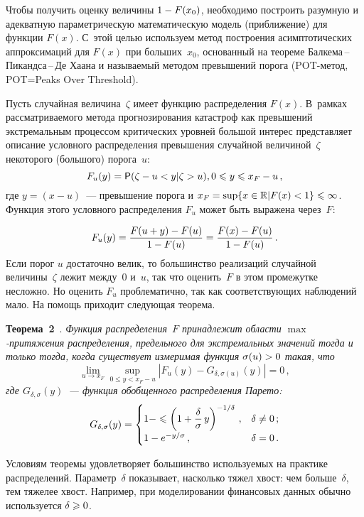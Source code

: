 \begin{multicols}{2}
Чтобы получить оценку величины $1\hm-F(x_0)$, необходимо построить
разумную и адекватную парамет\-рическую математическую модель
(приближение) для функции $F(x)$. С~этой целью используем метод
построения асимптотических аппрокси\-маций для $F(x)$ при больших~$x_0$, 
основанный на теореме Бал\-ке\-ма\,--\,Пи\-канд\-са\,--\,Де Ха\-ана и
называемый методом превышений порога (POT-ме\-тод, POT\;=\;Peaks Over
Threshold).

Пусть случайная величина~$\zeta$ имеет функцию распределения $F(x)$.
В~рамках рассматриваемого метода прогнозирования катастроф как
превышений экстремальным процессом критических \mbox{уровней} большой
интерес представляет описание условного распределения превышения
случайной величиной~$\zeta$ некоторого (большого) порога~$u$:
$$
F_u(y)={\sf P}(\zeta-u < y|\zeta>u), 0\leqslant y \leqslant x_F-u\,,
$$
где $y=(x-u)$~--- превышение порога и $x_F\hm =\sup\{x \hm\in \mathbb{R} | F(x)\hm<1\} 
\hm\leqslant \infty$. Функция этого условного распределения $F_u$ может быть 
выражена через~$F$:

\noindent
$$
F_u(y)=\displaystyle\frac{\displaystyle F(u+y)-F(u)\mathstrut}{\displaystyle 1-F(u)\mathstrut}=\displaystyle\frac{\displaystyle F(x)-F(u)\mathstrut}{\displaystyle 1-F(u)\mathstrut}\,.
$$
Если порог $u$ достаточно велик, то большинство реализаций случайной
величины~$\zeta$ лежит между~0 и~$u$, так что оценить~$F$ в этом
промежутке несложно. Но оценить $F_u$ проблематично, так как
соответствующих наблюдений мало. На помощь приходит следующая
теорема.

\smallskip

\noindent
\textbf{Теорема~2}~\cite{BalkemaDeHaan1974, Pickands1975}. \textit{Функция
распределения~$F$ принадлежит области $\max$-при\-тя\-же\-ния
распределения, предельного для экстремальных значений тогда и только
тогда, когда существует измеримая функция $\sigma(u)\hm>0$ такая, что}
$$
\lim\limits_{u \to x_F}\sup\limits_{0\leqslant y < x_F-u}|F_u(y)-G_{\delta, \sigma(u)}(y)|=0\,,
$$
{\it где $G_{\delta, \sigma}(y)$~--- функция обобщенного распределения Парето:}
$$
G_{\delta, \sigma}(y)=\begin{cases}
1-\leqslant \left(1+\displaystyle\frac{\displaystyle \delta\mathstrut}{\displaystyle \sigma\mathstrut}\,y\right)^{-1/\delta}\,, &\delta \neq 0\,;\\
1-e^{-y/\sigma}\,, & \delta=0\,.
\end{cases}
$$


\smallskip

Условиям теоремы удовлетворяет большинство используемых на практике
распределений. Параметр~$\delta$ показывает, насколько тяжел хвост: чем больше~$\delta$, 
тем тяжелее хвост. Например, при моделировании финансовых данных 
обычно используется $\delta \hm\geqslant 0$.


\end{multicols}
